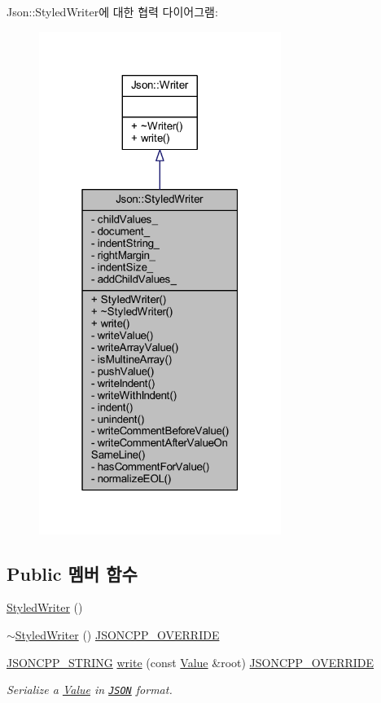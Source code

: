 Json\+:\+:Styled\+Writer에 대한 협력 다이어그램\+:\nopagebreak
\begin{figure}[H]
\begin{center}
\leavevmode
\includegraphics[width=223pt]{class_json_1_1_styled_writer__coll__graph}
\end{center}
\end{figure}
\subsection*{Public 멤버 함수}
\begin{DoxyCompactItemize}
\item 
\hyperlink{class_json_1_1_styled_writer_a1f1b5f922a6a0ef0e56c6dd2f6170192}{Styled\+Writer} ()
\item 
\hyperlink{class_json_1_1_styled_writer_a6a18380a4c5dd5e37a892dc182aac88c}{$\sim$\+Styled\+Writer} () \hyperlink{json_8h_a824d6199c91488107e443226fa6022c5}{J\+S\+O\+N\+C\+P\+P\+\_\+\+O\+V\+E\+R\+R\+I\+DE}
\item 
\hyperlink{json_8h_a1e723f95759de062585bc4a8fd3fa4be}{J\+S\+O\+N\+C\+P\+P\+\_\+\+S\+T\+R\+I\+NG} \hyperlink{class_json_1_1_styled_writer_a5efab19b9746da9920c29cdae3a6b404}{write} (const \hyperlink{class_json_1_1_value}{Value} \&root) \hyperlink{json_8h_a824d6199c91488107e443226fa6022c5}{J\+S\+O\+N\+C\+P\+P\+\_\+\+O\+V\+E\+R\+R\+I\+DE}
\begin{DoxyCompactList}\small\item\em Serialize a \hyperlink{class_json_1_1_value}{Value} in \href{http://www.json.org}{\tt J\+S\+ON} format. \end{DoxyCompactList}\end{DoxyCompactItemize}
